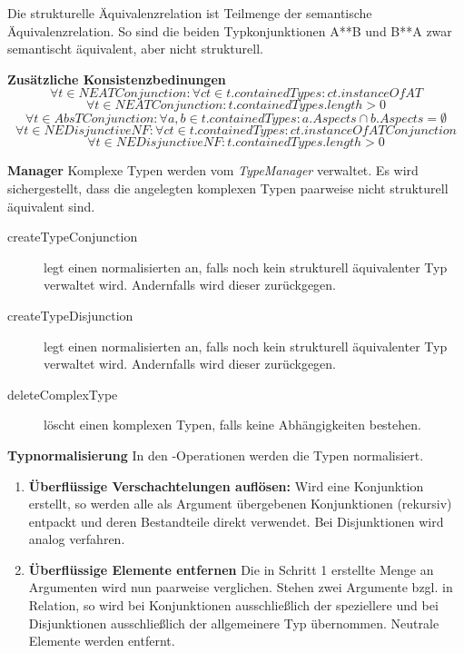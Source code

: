 Die strukturelle Äquivalenzrelation ist Teilmenge der semantische Äquivalenzrelation.
So sind die beiden Typkonjunktionen A**B und B**A zwar semantischt äquivalent, aber nicht strukturell.

\textbf{Zusätzliche Konsistenzbedinungen} \newline
\begin{equation}\forall t \in NEATConjunction : 
	\forall ct \in t.containedTypes : ct.instanceOf AT
\end{equation}
\begin{equation}\forall t \in NEATConjunction : 
	t.containedTypes.length > 0
\end{equation}
\begin{equation}\forall t \in AbsTConjunction : 
	\forall a,b \in t.containedTypes : a.Aspects \cap b.Aspects = \emptyset
\end{equation}
\begin{equation}\forall t \in NEDisjunctiveNF : 
	\forall ct \in t.containedTypes : ct.instanceOf ATConjunction
\end{equation}
\begin{equation}\forall t \in NEDisjunctiveNF : 
	t.containedTypes.length > 0
\end{equation}


\textbf{Manager} \newline
Komplexe Typen werden vom \emph{TypeManager} verwaltet. Es wird sichergestellt, dass 
die angelegten komplexen Typen paarweise nicht strukturell äquivalent sind. 

\begin{description}
\item[createTypeConjunction] legt einen normalisierten  an, falls noch kein strukturell äquivalenter Typ verwaltet wird. Andernfalls wird dieser zurückgegen.
\item[createTypeDisjunction] legt einen normalisierten  an, falls noch kein strukturell äquivalenter Typ verwaltet wird. Andernfalls wird dieser zurückgegen.
\item[deleteComplexType] löscht einen komplexen Typen, falls keine Abhängigkeiten bestehen.
\end{description}


\textbf{Typnormalisierung} \newline
In den -Operationen werden die Typen normalisiert. 
\begin{enumerate}
\item \textbf{Überflüssige Verschachtelungen auflösen:}  \newline 
	Wird eine Konjunktion erstellt, so werden alle als Argument übergebenen Konjunktionen (rekursiv) entpackt und deren Bestandteile direkt verwendet.
	Bei Disjunktionen wird analog verfahren. 
\item \textbf{Überflüssige Elemente entfernen}  \newline 
	Die in Schritt 1 erstellte Menge an Argumenten wird nun paarweise verglichen. Stehen zwei Argumente bzgl.  in Relation, so wird 
	bei Konjunktionen ausschließlich der speziellere und bei Disjunktionen ausschließlich der allgemeinere Typ übernommen. Neutrale Elemente werden 
	entfernt. 
\end{enumerate} 

